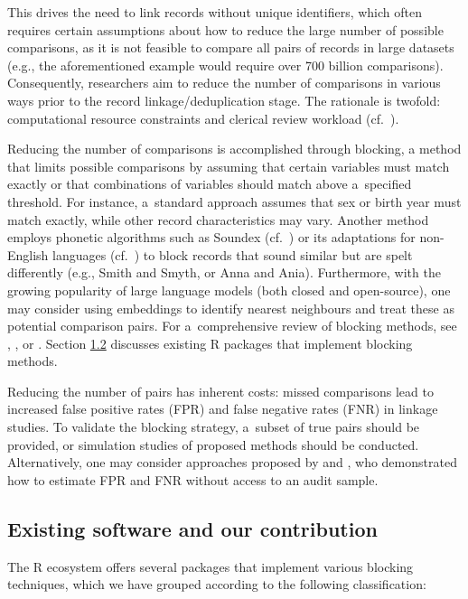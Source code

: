 This drives the need to link records without unique identifiers, which
often requires certain assumptions about how to reduce the large number
of possible comparisons, as it is not feasible to compare all pairs of
records in large datasets (e.g., the aforementioned example would
require over 700 billion comparisons). Consequently, researchers aim to
reduce the number of comparisons in various ways prior to the record
linkage/deduplication stage. The rationale is twofold: computational
resource constraints and clerical review workload (cf.~\citet{christen2012book}).

Reducing the number of comparisons is accomplished through blocking, a
method that limits possible comparisons by assuming that certain
variables must match exactly or that combinations of variables should
match above a~specified threshold. For instance, a~standard approach
assumes that sex or birth year must match exactly, while other record
characteristics may vary. Another method employs phonetic algorithms
such as Soundex (cf.~\citet{knuth1973}) or its adaptations for non-English
languages (cf.~\citet{Howard2020}) to block records that sound similar but are
spelt differently (e.g., Smith and Smyth, or Anna and Ania).
Furthermore, with the growing popularity of large language models (both
closed and open-source), one may consider using embeddings
\citep{mikolov2013efficient} to identify nearest neighbours and treat these
as potential comparison pairs. For a~comprehensive review of blocking
methods, see \citet{Christen2012}, \citet{Steorts2014}, or \citet{Papadakis2020}. Section
\hyperref[sec-software]{1.2} discusses existing R packages that implement
blocking methods.

Reducing the number of pairs has inherent costs: missed comparisons lead
to increased false positive rates (FPR) and false negative rates (FNR)
in linkage studies. To validate the blocking strategy, a~subset of true
pairs should be provided, or simulation studies of proposed methods
should be conducted. Alternatively, one may consider approaches proposed
by \citet{dasylva2021estimating} and \citet{dasylva2022consistent}, who demonstrated
how to estimate FPR and FNR without access to an audit sample.

\subsection{Existing software and our contribution}\label{sec-software}

The R ecosystem offers several packages that implement various blocking
techniques, which we have grouped according to the following
classification:

